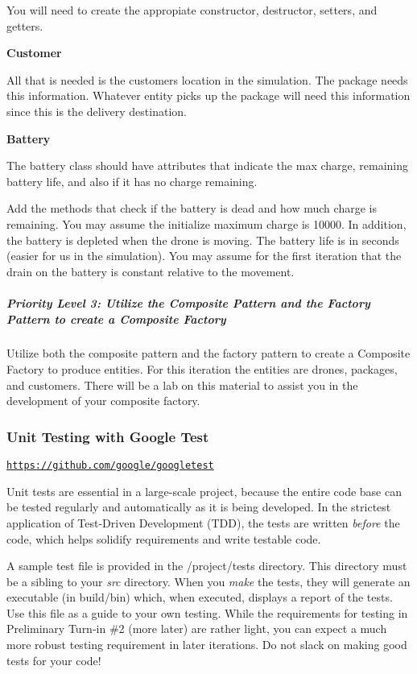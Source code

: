 You will need to create the appropiate constructor, destructor, setters, and getters.

{\bfseries Customer}

All that is needed is the customer\textquotesingle{}s location in the simulation. The package needs this information. Whatever entity picks up the package will need this information since this is the delivery destination.

{\bfseries Battery}

The battery class should have attributes that indicate the max charge, remaining battery life, and also if it has no charge remaining.

Add the methods that check if the battery is dead and how much charge is remaining. You may assume the initialize maximum charge is 10000. In addition, the battery is depleted when the drone is moving. The battery life is in seconds (easier for us in the simulation). You may assume for the first iteration that the drain on the battery is constant relative to the movement.

\subparagraph*{Priority Level 3\+: Utilize the Composite Pattern and the Factory Pattern to create a Composite Factory}

Utilize both the composite pattern and the factory pattern to create a Composite Factory to produce entities. For this iteration the entities are drones, packages, and customers. There will be a lab on this material to assist you in the development of your composite factory.





\subsubsection*{Unit Testing with Google Test}

\href{https://github.com/google/googletest}{\tt https\+://github.\+com/google/googletest}

Unit tests are essential in a large-\/scale project, because the entire code base can be tested regularly and automatically as it is being developed. In the strictest application of Test-\/\+Driven Development (T\+DD), the tests are written {\itshape before} the code, which helps solidify requirements and write testable code.

A sample test file is provided in the /project/tests directory. This directory must be a sibling to your {\itshape src} directory. When you {\itshape make} the tests, they will generate an executable (in build/bin) which, when executed, displays a report of the tests. Use this file as a guide to your own testing. While the requirements for testing in Preliminary Turn-\/in \#2 (more later) are rather light, you can expect a much more robust testing requirement in later iterations. Do not slack on making good tests for your code!

